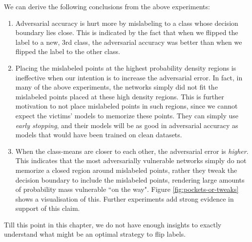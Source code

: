 \documentclass[12pt, oneside]{book}
\begin{document}
We can derive the following conclusions from the above experiments:
\begin{enumerate}
    \item Adversarial accuracy is hurt more by mislabeling to a class whose
    decision boundary lies close. This is indicated by the fact that when we
    flipped the label to a new, 3rd class, the adversarial accuracy was better
    than when we flipped the label to the other class.
    \item Placing the mislabeled points at the highest probability density
    regions is ineffective when our intention is to increase the adversarial
    error. In fact, in many of the above experiments, the networks simply did
    not fit the mislabeled points placed at these high density regions. This is
    further motivation to not place mislabeled points in such regions, since we
    cannot expect the victims' models to memorize these points. They can simply
    use \emph{early stopping}, and their models will be as good in adversarial
    accuracy as models that would have been trained on clean datasets.
    \item When the class-means are closer to each other, the adversarial error
    is \emph{higher}. This indicates that the most adversarially vulnerable
    networks simply do not memorize a closed region around mislabeled points,
    rather they tweak the decision boundary to include the mislabeled points,
    rendering large amounts of probability mass vulnerable ``on the way". Figure
    \ref{fig:pockets-or-tweaks} shows a visualisation of this. Further
    experiments add strong evidence in support of this claim.
\end{enumerate}

Till this point in this chapter, we do not have enough insights to exactly
understand what might be an optimal strategy to flip labels.




\end{document}
